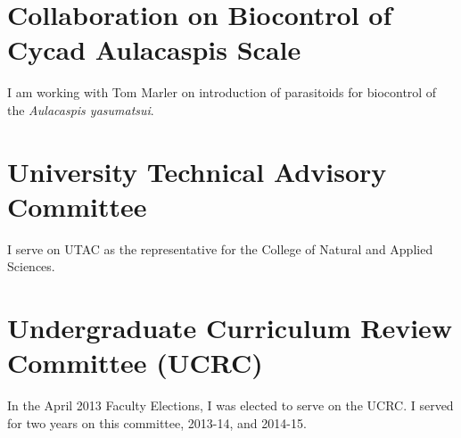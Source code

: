 \documentclass[12pt,oneside,english]{scrbook}
\begin{document}
\section{Collaboration on Biocontrol of Cycad Aulacaspis Scale}

I am working with Tom Marler on introduction of parasitoids for biocontrol of the \emph{Aulacaspis yasumatsui}.

\section{University Technical Advisory Committee}

I serve on UTAC as the representative for the College of Natural and
Applied Sciences.

\section{Undergraduate Curriculum Review Committee (UCRC)}

In the April 2013 Faculty Elections, I was elected to serve on the
UCRC. I served for two years on this committee, 2013-14, and 2014-15.
\end{document}
